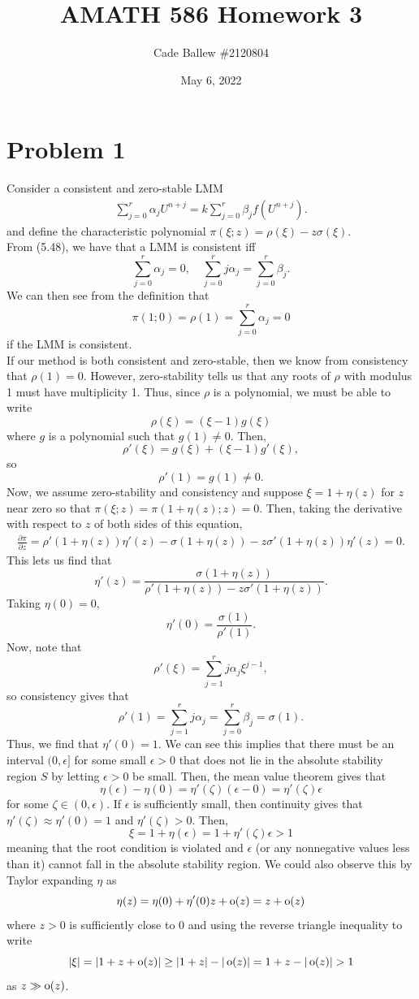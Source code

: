 \documentclass{article}
\title{AMATH 586 Homework 3}
\author{Cade Ballew \#2120804}
\date{May 6, 2022}
\begin{document}
	
\maketitle
	
\section{Problem 1}
Consider a consistent and zero-stable LMM
\begin{align*}
	\sum_{j=0}^r \alpha_j U^{n+j} = k \sum_{j=0}^r \beta_j f(U^{n+j}).
\end{align*}
and define the characteristic polynomial $\pi(\xi;z) = \rho(\xi) - z \sigma(\xi)$.\\
From (5.48), we have that a LMM is consistent iff 
\[
\sum_{j=0}^{r}\alpha_j=0,\quad\sum_{j=0}^{r}j\alpha_j=\sum_{j=0}^r\beta_j. 
\]
We can then see from the definition that
\[
\pi(1;0)=\rho(1)=\sum_{j=0}^{r}\alpha_j=0
\]
if the LMM is consistent. \\
If our method is both consistent and zero-stable, then we know from consistency that $\rho(1)=0$. However, zero-stability tells us that any roots of $\rho$ with modulus 1 must have multiplicity 1. Thus, since $\rho$ is a polynomial, we must be able to write 
\[
\rho(\xi)=(\xi-1)g(\xi)
\]
where $g$ is a polynomial such that $g(1)\neq0$. Then,
\[
\rho'(\xi)=g(\xi)+(\xi-1)g'(\xi),
\]
so 
\[
\rho'(1)=g(1)\neq0.
\]
Now, we assume zero-stability and consistency and suppose $\xi = 1 + \eta(z)$ for $z$ near zero so that $\pi(\xi;z) = \pi(1 + \eta(z);z) = 0$. Then, taking the derivative with respect to $z$ of both sides of this equation, 
\begin{align*}
\frac{\partial \pi}{\partial z}=\rho'(1+\eta(z))\eta'(z)-\sigma(1+\eta(z))-z\sigma'(1+\eta(z))\eta'(z)=0.
\end{align*}
This lets us find that 
\[
\eta'(z)=\frac{\sigma(1+\eta(z))}{\rho'(1+\eta(z))-z\sigma'(1+\eta(z))}.
\]
Taking $\eta(0)=0$, %
\[
\eta'(0)=\frac{\sigma(1)}{\rho'(1)}.
\]
Now, note that
\[
\rho'(\xi)=\sum_{j=1}^rj\alpha_j\xi^{j-1},
\]
so consistency gives that
\[
\rho'(1)=\sum_{j=1}^rj\alpha_j=\sum_{j=0}^r\beta_j=\sigma(1).
\]
Thus, we find that $\eta'(0)=1$. We can see this implies that there must be an interval $(0,\epsilon]$ for some small $\epsilon > 0$ that does not lie in the absolute stability region $S$ by letting $\epsilon > 0$ be small. Then, the mean value theorem gives that
\[
\eta(\epsilon)-\eta(0)=\eta'(\zeta)(\epsilon-0)=\eta'(\zeta)\epsilon
\]
for some $\zeta\in(0,\epsilon)$. If $\epsilon$ is sufficiently small, then continuity gives that $\eta'(\zeta)\approx \eta'(0)=1$ and $\eta'(\zeta)>0$. Then, 
\[
\xi=1+\eta(\epsilon)=1+\eta'(\zeta)\epsilon>1
\]
meaning that the root condition is violated and $\epsilon$ (or any nonnegative values less than it) cannot fall in the absolute stability region. We could also observe this by Taylor expanding $\eta$ as
\[
\eta(z)=\eta(0)+\eta'(0)z+\operatorname{o}(z)=z+\operatorname{o}(z)
\]
where $z>0$ is sufficiently close to $0$ and using the reverse triangle inequality to write
\[
|\xi|=|1+z+\oo(z)|\geq|1+z|-|\oo(z)|=1+z-|\oo(z)|>1
\]
as $z\gg\operatorname{o}(z)$.
\end{document}
